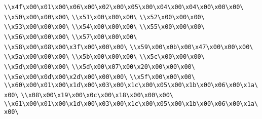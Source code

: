 \verb|\\x4f\x00\x01\x00\x06\x00\x02\x00\x05\x00\x04\x00\x04\x00\x00\x00\|\newline
\verb|\\x50\x00\x00\x00\|\newline
\verb|\\x51\x00\x00\x00\|\newline
\verb|\\x52\x00\x00\x00\|\newline
\verb|\\x53\x00\x00\x00\|\newline
\verb|\\x54\x00\x00\x00\|\newline
\verb|\\x55\x00\x00\x00\|\newline
\verb|\\x56\x00\x00\x00\|\newline
\verb|\\x57\x00\x00\x00\|\newline
\verb|\\x58\x00\x08\x00\x3f\x00\x00\x00\|\newline
\verb|\\x59\x00\x0b\x00\x47\x00\x00\x00\|\newline
\verb|\\x5a\x00\x00\x00\|\newline
\verb|\\x5b\x00\x00\x00\|\newline
\verb|\\x5c\x00\x00\x00\|\newline
\verb|\\x5d\x00\x00\x00\|\newline
\verb|\\x5d\x00\x07\x00\x20\x00\x00\x00\|\newline
\verb|\\x5e\x00\x0d\x00\x2d\x00\x00\x00\|\newline
\verb|\\x5f\x00\x00\x00\|\newline
\verb|\\x60\x00\x01\x00\x1d\x00\x03\x00\x1c\x00\x05\x00\x1b\x00\x06\x00\x1a\x00\|\newline
\verb|\\x08\x00\x19\x00\x0c\x00\x18\x00\x00\x00\|\newline
\verb|\\x61\x00\x01\x00\x1d\x00\x03\x00\x1c\x00\x05\x00\x1b\x00\x06\x00\x1a\x00\|\newline
